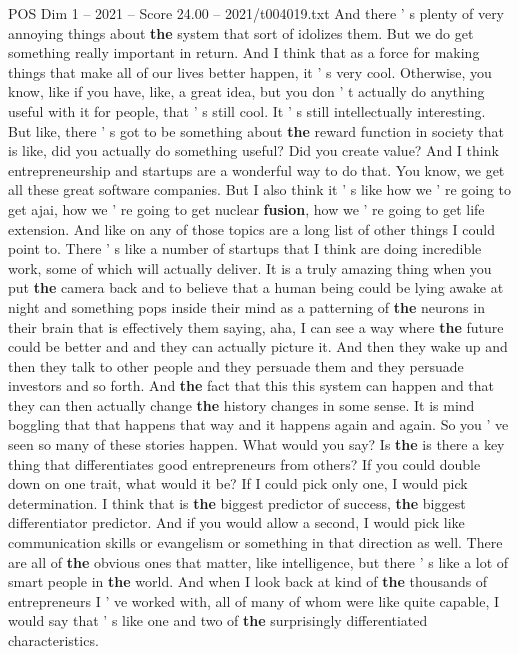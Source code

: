 \begin{textsample}{POS Dim 1 – 2021 – Score 24.00 – 2021/t004019.txt}
And there ' s plenty of very annoying things about \textbf{the} system that sort of idolizes them.
But we do get something really important in return.
And I think that as a force for making things that make all of our lives better happen, it ' s very cool.
Otherwise, you know, like if you have, like, a great idea, but you don ' t actually do anything useful with it for people, that ' s still cool.
It ' s still intellectually interesting.
But like, there ' s got to be something about \textbf{the} reward function in society that is like, did you actually do something useful?
Did you create value?
And I think entrepreneurship and startups are a wonderful way to do that.
You know, we get all these great software companies.
But I also think it ' s like how we ' re going to get ajai, how we ' re going to get nuclear \textbf{fusion}, how we ' re going to get life extension.
And like on any of those topics are a long list of other things I could point to.
There ' s like a number of startups that I think are doing incredible work, some of which will actually deliver.
It is a truly amazing thing when you put \textbf{the} camera back and to believe that a human being could be lying awake at night and something pops inside their mind as a patterning of \textbf{the} neurons in their brain that is effectively them saying, aha, I can see a way where \textbf{the} future could be better and and they can actually picture it.
And then they wake up and then they talk to other people and they persuade them and they persuade investors and so forth.
And \textbf{the} fact that this this system can happen and that they can then actually change \textbf{the} history changes in some sense.
It is mind boggling that that happens that way and it happens again and again.
So you ' ve seen so many of these stories happen.
What would you say?
Is \textbf{the} is there a key thing that differentiates good entrepreneurs from others?
If you could double down on one trait, what would it be?
If I could pick only one, I would pick determination.
I think that is \textbf{the} biggest predictor of success, \textbf{the} biggest differentiator predictor.
And if you would allow a second, I would pick like communication skills or evangelism or something in that direction as well.
There are all of \textbf{the} obvious ones that matter, like intelligence, but there ' s like a lot of smart people in \textbf{the} world.
And when I look back at kind of \textbf{the} thousands of entrepreneurs I ' ve worked with, all of many of whom were like quite capable, I would say that ' s like one and two of \textbf{the} surprisingly differentiated characteristics.

\end{textsample}
